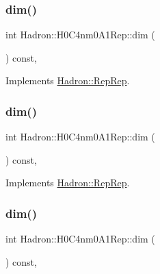 \subsubsection{\texorpdfstring{dim()}{dim()}\hspace{0.1cm}{\footnotesize\ttfamily [3/5]}}
{\footnotesize\ttfamily int Hadron\+::\+H0\+C4nm0\+A1\+Rep\+::dim (\begin{DoxyParamCaption}{ }\end{DoxyParamCaption}) const\hspace{0.3cm}{\ttfamily [inline]}, {\ttfamily [virtual]}}



Implements \mbox{\hyperlink{structHadron_1_1RepRep_a92c8802e5ed7afd7da43ccfd5b7cd92b}{Hadron\+::\+Rep\+Rep}}.

\mbox{\label{structHadron_1_1H0C4nm0A1Rep_a75a9237739a48786d90912cccfa9639e}} 
\subsubsection{\texorpdfstring{dim()}{dim()}\hspace{0.1cm}{\footnotesize\ttfamily [4/5]}}
{\footnotesize\ttfamily int Hadron\+::\+H0\+C4nm0\+A1\+Rep\+::dim (\begin{DoxyParamCaption}{ }\end{DoxyParamCaption}) const\hspace{0.3cm}{\ttfamily [inline]}, {\ttfamily [virtual]}}



Implements \mbox{\hyperlink{structHadron_1_1RepRep_a92c8802e5ed7afd7da43ccfd5b7cd92b}{Hadron\+::\+Rep\+Rep}}.

\mbox{\label{structHadron_1_1H0C4nm0A1Rep_a75a9237739a48786d90912cccfa9639e}} 
\subsubsection{\texorpdfstring{dim()}{dim()}\hspace{0.1cm}{\footnotesize\ttfamily [5/5]}}
{\footnotesize\ttfamily int Hadron\+::\+H0\+C4nm0\+A1\+Rep\+::dim (\begin{DoxyParamCaption}{ }\end{DoxyParamCaption}) const\hspace{0.3cm}{\ttfamily [inline]}, {\ttfamily [virtual]}}



